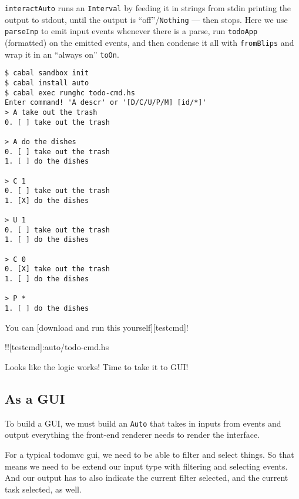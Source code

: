 \documentclass[]{article}
\begin{document}
\texttt{interactAuto} runs an \texttt{Interval} by feeding it in strings
from stdin printing the output to stdout, until the output is
``off''/\texttt{Nothing} --- then stops. Here we use \texttt{parseInp}
to emit input events whenever there is a parse, run \texttt{todoApp}
(formatted) on the emitted events, and then condense it all with
\texttt{fromBlips} and wrap it in an ``always on'' \texttt{toOn}.

\begin{verbatim}
$ cabal sandbox init
$ cabal install auto
$ cabal exec runghc todo-cmd.hs
Enter command! 'A descr' or '[D/C/U/P/M] [id/*]'
> A take out the trash
0. [ ] take out the trash

> A do the dishes
0. [ ] take out the trash
1. [ ] do the dishes

> C 1
0. [ ] take out the trash
1. [X] do the dishes

> U 1
0. [ ] take out the trash
1. [ ] do the dishes

> C 0
0. [X] take out the trash
1. [ ] do the dishes

> P *
1. [ ] do the dishes
\end{verbatim}

You can {[}download and run this yourself{]}{[}testcmd{]}!

!!{[}testcmd{]}:auto/todo-cmd.hs

Looks like the logic works! Time to take it to GUI!

\subsection{As a GUI}\label{as-a-gui}

To build a GUI, we must build an \texttt{Auto} that takes in inputs from
events and output everything the front-end renderer needs to render the
interface.

For a typical todomvc gui, we need to be able to filter and select
things. So that means we need to be extend our input type with filtering
and selecting events. And our output has to also indicate the current
filter selected, and the current task selected, as well.
\end{document}
